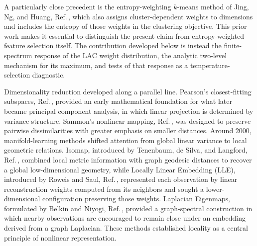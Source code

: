 \documentclass[11pt,a4paper]{article}
\theoremstyle{definition}
\theoremstyle{plain}
\begin{document}
A particularly close precedent is the entropy-weighting $k$-means method of Jing, Ng, and Huang, Ref.\,\cite{jing2007entropy}, which also assigns cluster-dependent weights to dimensions and includes the entropy of those weights in the clustering objective. This prior work makes it essential to distinguish the present claim from entropy-weighted feature selection itself. The contribution developed below is instead the finite-spectrum response of the LAC weight distribution, the analytic two-level mechanism for its maximum, and tests of that response as a temperature-selection diagnostic.


Dimensionality reduction developed along a parallel line. Pearson's closest-fitting subspaces, Ref.\,\cite{pearson1901}, provided an early mathematical foundation for what later became principal component analysis, in which linear projection is determined by variance structure. Sammon's nonlinear mapping, Ref.\,\cite{sammon1969}, was designed to preserve pairwise dissimilarities with greater emphasis on smaller distances. Around 2000, manifold-learning methods shifted attention from global linear variance to local geometric relations. Isomap, introduced by Tenenbaum, de Silva, and Langford, Ref.\,\cite{tenenbaum2000isomap}, combined local metric information with graph geodesic distances to recover a global low-dimensional geometry, while Locally Linear Embedding (LLE), introduced by Roweis and Saul, Ref.\,\cite{roweis2000lle}, represented each observation by linear reconstruction weights computed from its neighbors and sought a lower-dimensional configuration preserving those weights. Laplacian Eigenmaps, formulated by Belkin and Niyogi, Ref.\,\cite{belkin2003laplacian}, provided a graph-spectral construction in which nearby observations are encouraged to remain close under an embedding derived from a graph Laplacian. These methods established locality as a central principle of nonlinear representation.
\end{document}
